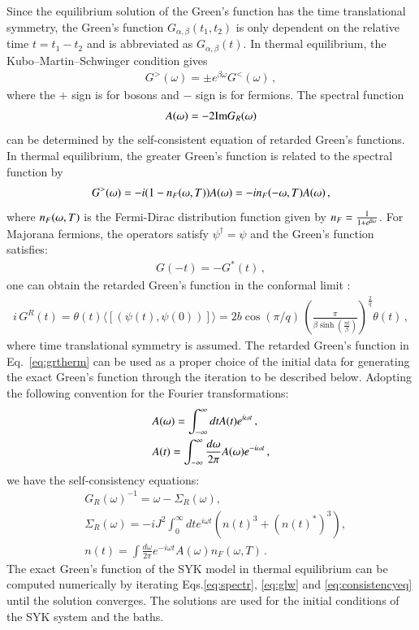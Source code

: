 Since the equilibrium solution of the Green's function has the time translational symmetry, the Green's function $G_{\alpha,\beta}(t_1,t_2)$ is only dependent on the relative time $t=t_1-t_2$ and is abbreviated as $G_{\alpha,\beta}(t)$. 
In thermal equilibrium, the Kubo–Martin–Schwinger condition gives \cite{kamenev2023field}
\begin{align}
    G^>(\omega)=\pm e^{\beta \omega} G^<(\omega)\,,
\end{align}
where the $+$ sign is for bosons and $-$ sign is for fermions. The spectral function 
\begin{align}
    A({\omega})=-2\mathrm{Im} G_R(\omega)
    \label{eq:spectr}
\end{align}
can be determined by the self-consistent equation of retarded Green's functions. In thermal equilibrium, the greater Green's function is related to the spectral function by
\begin{align}
    G^>(\omega)=-i (1-n_F({\omega},T)) A({\omega}) =-i n_F(-\omega,T) A({\omega})\,,
    \label{eq:glw}
\end{align}
where $n_F({\omega},T)$ is the Fermi-Dirac distribution function given by $n_F=\frac{1}{1+e^{\beta {\omega}}}$. For Majorana fermions, the operators satisfy $\psi^\dag=\psi$ and the Green's function satisfies:
\begin{align}
    G(-t)=-G^*(t)\,,
\end{align}
one can obtain the retarded Green's function in the conformal limit \cite{maldacena2016remarks}:
\begin{align}
    i\,G^R(t)=\theta(t) \langle [(\psi(t),\psi(0))] \rangle=2b\cos(\pi/q) \,\left(\frac{\pi}{\beta \sinh(\frac{\pi t}{\beta})}\right)^{\frac{2}{q}} \theta(t)\,,
    \label{eq:grtherm}
\end{align}
where time translational symmetry is assumed. The retarded Green's function in Eq.~\eqref{eq:grtherm} can be used as a proper choice of the initial data for generating the exact Green's function through the iteration to be described below. Adopting the following convention for the Fourier transformations:
\begin{align}
    &A({\omega})=\int_{-\infty}^\infty dt A(t) e^{i{\omega} t}\,,\\
    &A(t)=\int_{-\infty}^\infty \frac{d{\omega}}{2\pi} A({\omega}) e^{-i{\omega} t}\,,
\end{align}
we have the self-consistency equations:
\begin{equation}
\begin{split}
    &G_{R}(\omega)^{-1}=\omega-\Sigma_{R}(\omega), \\
    &\Sigma_{R}(\omega)=-iJ^2\int_0^\infty dt e^{i\omega t}(n(t)^3+(n(t)^*)^3), \\
    &n(t)=\int \frac{d\omega}{2\pi} e^{-i\omega t} A(\omega)n_F(\omega, T)\,.
\end{split}
\label{eq:consistencyeq}
\end{equation}
The exact Green's function of the SYK model in thermal equilibrium can be computed numerically by iterating Eqs.\eqref{eq:spectr}, \eqref{eq:glw} and \eqref{eq:consistencyeq} until the solution converges. The solutions are used for the initial conditions of the SYK system and the baths. 

